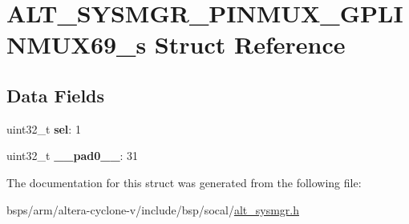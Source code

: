 \hypertarget{structALT__SYSMGR__PINMUX__GPLINMUX69__s}{}\section{A\+L\+T\+\_\+\+S\+Y\+S\+M\+G\+R\+\_\+\+P\+I\+N\+M\+U\+X\+\_\+\+G\+P\+L\+I\+N\+M\+U\+X69\+\_\+s Struct Reference}
\label{structALT__SYSMGR__PINMUX__GPLINMUX69__s}
\subsection*{Data Fields}
\begin{DoxyCompactItemize}
\item 
\mbox{\label{structALT__SYSMGR__PINMUX__GPLINMUX69__s_af0feeb98d0d43b205c1a6e1ff68009d7}} 
uint32\+\_\+t {\bfseries sel}\+: 1
\item 
\mbox{\label{structALT__SYSMGR__PINMUX__GPLINMUX69__s_a2e7ce4e166ee26fb99135537f751d065}} 
uint32\+\_\+t {\bfseries \+\_\+\+\_\+pad0\+\_\+\+\_\+}\+: 31
\end{DoxyCompactItemize}


The documentation for this struct was generated from the following file\+:\begin{DoxyCompactItemize}
\item 
bsps/arm/altera-\/cyclone-\/v/include/bsp/socal/\mbox{\hyperlink{alt__sysmgr_8h}{alt\+\_\+sysmgr.\+h}}\end{DoxyCompactItemize}
